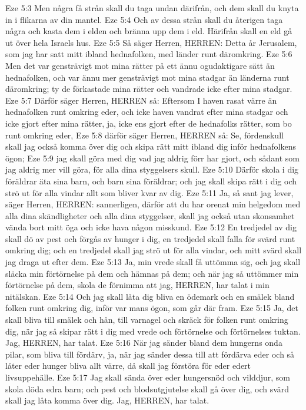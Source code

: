 Eze 5:3  Men några få strån skall du taga undan därifrån, och dem skall du knyta in i flikarna av din mantel.
Eze 5:4  Och av dessa strån skall du återigen taga några och kasta dem i elden och bränna upp dem i eld. Härifrån skall en eld gå ut över hela Israels hus.
Eze 5:5  Så säger Herren, HERREN: Detta år Jerusalem, som jag har satt mitt ibland hednafolken, med länder runt däromkring.
Eze 5:6  Men det var gensträvigt mot mina rätter på ett ännu ogudaktigare sätt än hednafolken, och var ännu mer gensträvigt mot mina stadgar än länderna runt däromkring; ty de förkastade mina rätter och vandrade icke efter mina stadgar.
Eze 5:7  Därför säger Herren, HERREN så: Eftersom I haven rasat värre än hednafolken runt omkring eder, och icke haven vandrat efter mina stadgar och icke gjort efter mina rätter, ja, icke ens gjort efter de hednafolks rätter, som bo runt omkring eder,
Eze 5:8  därför säger Herren, HERREN så: Se, fördenskull skall jag också komma över dig och skipa rätt mitt ibland dig inför hednafolkens ögon;
Eze 5:9  jag skall göra med dig vad jag aldrig förr har gjort, och sådant som jag aldrig mer vill göra, för alla dina styggelsers skull.
Eze 5:10  Därför skola i dig föräldrar äta sina barn, och barn sina föräldrar; och jag skall skipa rätt i dig och strö ut för alla vindar allt som bliver kvar av dig.
Eze 5:11  Ja, så sant jag lever, säger Herren, HERREN: sannerligen, därför att du har orenat min helgedom med alla dina skändligheter och alla dina styggelser, skall jag också utan skonsamhet vända bort mitt öga och icke hava någon misskund.
Eze 5:12  En tredjedel av dig skall dö av pest och förgås av hunger i dig, en tredjedel skall falla för svärd runt omkring dig; och en tredjedel skall jag strö ut för alla vindar, och mitt svärd skall jag draga ut efter dem.
Eze 5:13  Ja, min vrede skall få uttömma sig, och jag skall släcka min förtörnelse på dem och hämnas på dem; och när jag så uttömmer min förtörnelse på dem, skola de förnimma att jag, HERREN, har talat i min nitälskan.
Eze 5:14  Och jag skall låta dig bliva en ödemark och en smälek bland folken runt omkring dig, inför var mans ögon, som går där fram.
Eze 5:15  Ja, det skall bliva till smälek och hån, till varnagel och skräck för folken runt omkring dig, när jag så skipar rätt i dig med vrede och förtörnelse och förtörnelses tuktan. Jag, HERREN, har talat.
Eze 5:16  När jag sänder bland dem hungerns onda pilar, som bliva till fördärv, ja, när jag sänder dessa till att fördärva eder och så låter eder hunger bliva allt värre, då skall jag förstöra för eder edert livsuppehälle.
Eze 5:17  Jag skall sända över eder hungersnöd och vilddjur, som skola döda edra barn; och pest och blodsutgjutelse skall gå över dig, och svärd skall jag låta komma över dig. Jag, HERREN, har talat.
